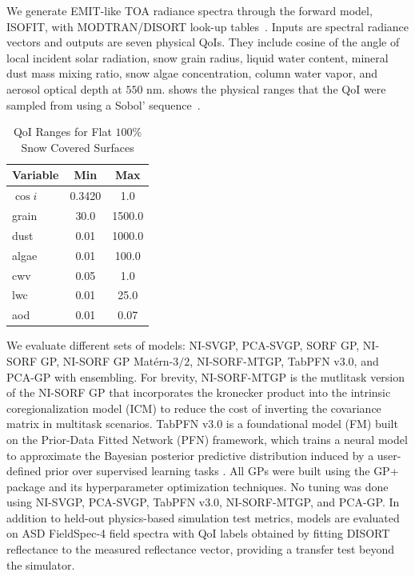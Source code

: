 \documentclass[11pt]{article}
\begin{document}
We generate EMIT-like TOA radiance spectra through the forward model, ISOFIT, with
MODTRAN/DISORT look-up tables~\cite{thompson2018isofit,berk2014modtran,stamnes1988disort}.
Inputs are spectral radiance vectors and outputs are seven physical QoIs.
They include cosine of the angle of local incident solar radiation, snow grain radius, liquid water content, mineral dust mass mixing ratio, snow algae concentration, column water vapor, and aerosol optical depth at $550$ nm.  shows the physical ranges that the QoI were sampled from using a Sobol'
sequence~\cite{sobol1967,owen1998sobol}.

\begin{table}[htbp]
\centering
\caption{QoI Ranges for Flat $100\%$ Snow Covered Surfaces}
\label{tab:sobol-ranges}
\begin{tabular}{lcc}
    \toprule
    Variable & Min & Max \\
    \midrule
    $\cos i$ & 0.3420 & 1.0 \\
    grain    & 30.0   & 1500.0 \\
    dust     & 0.01   & 1000.0 \\
    algae    & 0.01   & 100.0 \\
    cwv      & 0.05   & 1.0 \\
    lwc      & 0.01   & 25.0 \\
    aod      & 0.01   & 0.07 \\
    \bottomrule
  \end{tabular}
\end{table}

We evaluate different sets of models: NI-SVGP, PCA-SVGP, SORF GP, NI-SORF GP, NI-SORF GP Mat\'ern-$3/2$, NI-SORF-MTGP, TabPFN v3.0, and PCA-GP with ensembling. For brevity, NI-SORF-MTGP is the mutlitask version of the NI-SORF GP that incorporates the kronecker product into the intrinsic coregionalization model (ICM) to reduce the cost of inverting the covariance matrix in multitask scenarios. TabPFN v3.0 is a foundational model (FM) built on the Prior-Data Fitted Network (PFN) framework, which trains a neural model to approximate the Bayesian posterior predictive distribution induced by a user-defined prior over supervised learning tasks \cite{Hollmann2025NatureTabPFN}. All GPs were built using the GP+ package and its hyperparameter optimization techniques. No tuning was done using NI-SVGP, PCA-SVGP, TabPFN v3.0, NI-SORF-MTGP, and PCA-GP.
In addition to held-out physics-based simulation test metrics, models are evaluated on ASD FieldSpec-4
field spectra with QoI labels obtained by fitting DISORT reflectance to the measured
reflectance vector, providing a transfer test
beyond the simulator.
\end{document}
